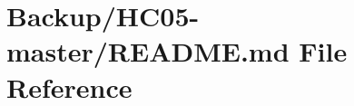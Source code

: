 \hypertarget{_backup_2_h_c05-master_2_r_e_a_d_m_e_8md}{}\section{Backup/\+H\+C05-\/master/\+R\+E\+A\+D\+ME.md File Reference}
\label{_backup_2_h_c05-master_2_r_e_a_d_m_e_8md}
